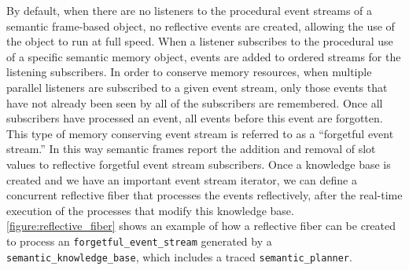 By default, when there are no listeners to the procedural event
streams of a semantic frame-based object, no reflective events are
created, allowing the use of the object to run at full speed.  When a
listener subscribes to the procedural use of a specific semantic
memory object, events are added to ordered streams for the listening
subscribers.  In order to conserve memory resources, when multiple
parallel listeners are subscribed to a given event stream, only those
events that have not already been seen by all of the subscribers are
remembered.  Once all subscribers have processed an event, all events
before this event are forgotten.  This type of memory conserving event
stream is referred to as a ``forgetful event stream.''  In this way
semantic frames report the addition and removal of slot values to
reflective forgetful event stream subscribers.  Once a knowledge base
is created and we have an important event stream iterator, we can
define a concurrent reflective fiber that processes the events
reflectively, after the real-time execution of the processes that
modify this knowledge base.
{\mbox{\autoref{figure:reflective_fiber}}} shows an example of how a
reflective fiber can be created to process an
{\tt{forgetful\_event\_stream}} generated by a
{\tt{semantic\_knowledge\_base}}, which includes a traced
{\tt{semantic\_planner}}.
